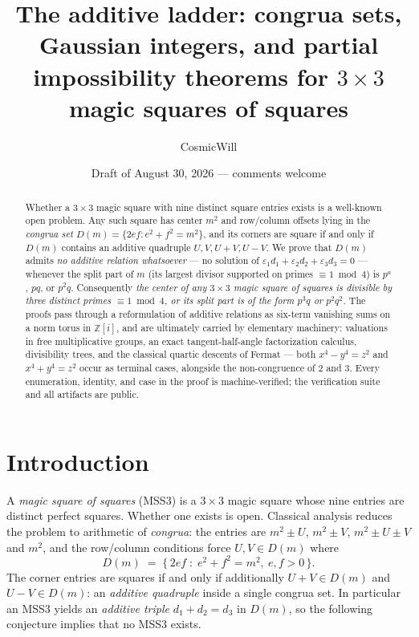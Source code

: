 \documentclass[11pt]{amsart}
\title{The additive ladder: congrua sets, Gaussian integers,
and partial impossibility theorems for $3\times3$ magic squares of squares}
\author{CosmicWill}
\date{Draft of August 30, 2026 --- comments welcome}
\theoremstyle{definition}
\newcommand{\Z}{\mathbb{Z}}
\begin{document}
\begin{abstract}
Whether a $3\times3$ magic square with nine distinct square entries
exists is a well-known open problem. Any such square has center
$m^2$ and row/column offsets lying in the \emph{congrua set}
$D(m) = \{2ef : e^2+f^2=m^2\}$, and its corners are square if and
only if $D(m)$ contains an additive quadruple $U, V, U{+}V, U{-}V$.
We prove that $D(m)$ admits \emph{no additive relation whatsoever}
--- no solution of $\varepsilon_1 d_1 + \varepsilon_2 d_2 +
\varepsilon_3 d_3 = 0$ --- whenever the split part of $m$ (its
largest divisor supported on primes $\equiv 1 \bmod 4$) is $p^a$,
$pq$, or $p^2q$. Consequently \emph{the center of any $3\times3$
magic square of squares is divisible by three distinct primes
$\equiv 1 \bmod 4$, or its split part is of the form $p^3q$ or
$p^2q^2$.} The proofs pass through a reformulation of additive
relations as six-term vanishing sums on a norm torus in $\Z[i]$,
and are ultimately carried by elementary machinery: valuations in
free multiplicative groups, an exact tangent-half-angle
factorization calculus, divisibility trees, and the classical
quartic descents of Fermat --- both $x^4-y^4=z^2$ and $x^4+y^4=z^2$
occur as terminal cases, alongside the non-congruence of $2$ and
$3$. Every enumeration, identity, and case in the proof is
machine-verified; the verification suite and all artifacts are
public.
\end{abstract}

\maketitle

\section{Introduction}

A \emph{magic square of squares} (MSS3) is a $3\times3$ magic
square whose nine entries are distinct perfect squares. Whether one
exists is open. Classical analysis reduces the problem to
arithmetic of \emph{congrua}: the entries are
$m^2 \pm U$, $m^2 \pm V$, $m^2 \pm U \pm V$ and $m^2$, and the
row/column conditions force $U, V \in D(m)$ where
\[
D(m) \;=\; \{\, 2ef \;:\; e^2 + f^2 = m^2,\ e, f > 0 \,\}.
\]
The corner entries are squares if and only if additionally
$U + V \in D(m)$ and $U - V \in D(m)$: an \emph{additive
quadruple} inside a single congrua set. In particular an MSS3
yields an \emph{additive triple} $d_1 + d_2 = d_3$ in $D(m)$, so
the following conjecture implies that no MSS3 exists.
\end{document}
